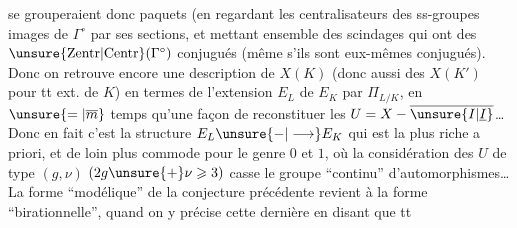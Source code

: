se grouperaient donc   paquets
(en regardant les centralisateurs des ss-groupes
images de $\Gamma^\circ$ par ses sections, et 
mettant ensemble des scindages qui ont des
$\unsure{\mathrm{Zentr}|\mathrm{Centr}}(\Gamma^\circ)$ conjugués (même s'ils  sont
eux-mêmes conjugués). Donc on retrouve
encore une description de $X(K)$ (donc
aussi des $X(K')$ pour tt ext.   de $K$)
en termes de l'extension $E_L$ de $E_K$ par
$\Pi_{L/K}$, en $\unsure{=|\overline m}$ temps qu'une façon de
reconstituer les $U=X-\overline{\unsure{I|\underline I}}$\ldots
Donc en fait c'est la structure $E_L\unsure{-|\longrightarrow}E_K$
qui est la plus riche a priori, et de
loin plus commode pour le genre $0$ et $1$,
où la considération des $U$ de type $(g,\nu)$
$(2g\unsure{+}\nu\geqslant3)$ casse le groupe ``continu''
d'automorphismes\ldots La forme ``modélique''
de la conjecture précédente revient
à la forme ``birationnelle'', quand on y
précise cette dernière en disant que tt

